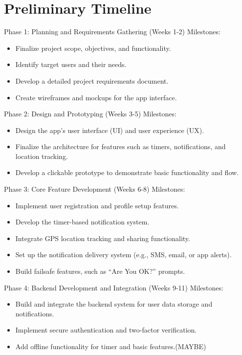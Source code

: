 \documentclass{article} %
\begin{document}
\section{Preliminary Timeline}
Phase 1: Planning and Requirements Gathering (Weeks 1-2)
Milestones:
\begin{itemize}
\item Finalize project scope, objectives, and functionality.
\item Identify target users and their needs.
\item Develop a detailed project requirements document.
\item Create wireframes and mockups for the app interface.
\end{itemize}

Phase 2: Design and Prototyping (Weeks 3-5)
Milestones:
\begin{itemize}
\item Design the app’s user interface (UI) and user experience (UX).
\item Finalize the architecture for features such as timers, notifications, and location tracking.
\item Develop a clickable prototype to demonstrate basic functionality and flow.
\end{itemize}

Phase 3: Core Feature Development (Weeks 6-8)
Milestones:
\begin{itemize}
\item Implement user registration and profile setup features.
\item Develop the timer-based notification system.
\item Integrate GPS location tracking and sharing functionality.
\item Set up the notification delivery system (e.g., SMS, email, or app alerts).
\item Build failsafe features, such as “Are You OK?” prompts.
\end{itemize}

Phase 4: Backend Development and Integration (Weeks 9-11)
Milestones:
\begin{itemize}
\item Build and integrate the backend system for user data storage and notifications.
\item Implement secure authentication and two-factor verification.
\item Add offline functionality for timer and basic features.(MAYBE)
\end{itemize}
\end{document}
